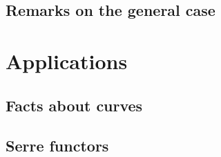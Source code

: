 \documentclass[10pt,a4paper]{article}
\theoremstyle{lecture}
\begin{document}
\subsection{Remarks on the general case}
\label{subsection:remarks}


\section{Applications}
\label{section:applications}

\subsection{Facts about curves}
\label{subsection:facts-curves}

\subsection{Serre functors}
\label{subsection:serre-functors}

\printbibliography
\end{document}
